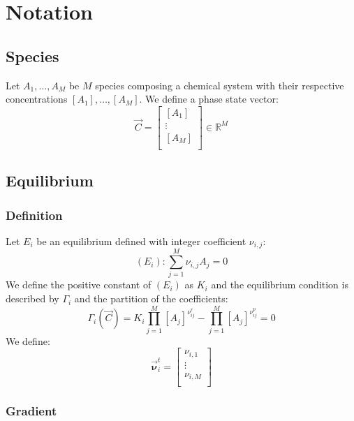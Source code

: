\documentclass[aps,12pt]{revtex4}
\begin{document}
\section{Notation}

\subsection{Species}
Let $A_1,\dots,A_M$ be $M$ species composing a chemical system
with their respective concentrations $[A_1],\ldots,[A_M]$.
We define a phase state vector:
\begin{equation}
	\vec{C} = 
	\begin{bmatrix}
	[A_1]\\
	\vdots\\
	[A_M]\\
	\end{bmatrix}
	\in \mathbb{R}^M
\end{equation}

\subsection{Equilibrium}
\subsubsection{Definition}
Let $E_i$ be an equilibrium defined with integer coefficient $\nu_{i,j}$:
\begin{equation}
	(E_i) :  \sum_{j=1}^M \nu_{i,j} A_j = 0
\end{equation}
We define the positive constant of $(E_i)$ as $K_i$ and the
equilibrium condition is described by $\Gamma_i$ and the partition
of the coefficients:
\begin{equation}
	\Gamma_i(\vec{C}) = K_i \prod_{j=1}^{M} [A_j]^{\nu^r_{ij}} 
	- \prod_{j=1}^{M} [A_j]^{\nu^p_{ij}} = 0
\end{equation}
We define:
\begin{equation}
	\vec{\bm{\nu}}^t_i = 
	\begin{bmatrix}
	\nu_{i,1}\\
	\vdots\\
	\nu_{i,M}\\
	\end{bmatrix}
\end{equation}

\subsubsection{Gradient}
\end{document}
